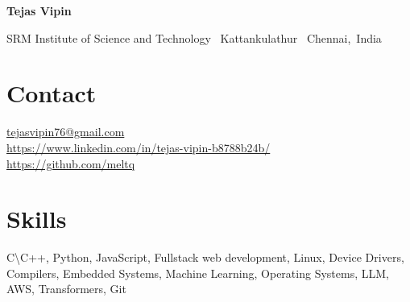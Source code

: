 \documentclass{OpenCV}
\newlength{\hvspace}
\begin{document}
\begin{center}
    \noindent\textbf{\LARGE Tejas Vipin} \\
\end{center}
\vspace{\hvspace}
\hrulefill
\vspace{\hvspace}
\begin{center}
    \noindent SRM Institute of Science and Technology \textbullet\ Kattankulathur \textbullet\ Chennai,\, India \\
\end{center}
\vspace{\hvspace}
\vspace{-4pt}
\hrulefill
\vspace{-12pt}

\section*{Contact}
\faEnvelopeO\enskip \href{mailto:tejasvipin76@gmail.com}{tejasvipin76@gmail.com} \\
\faLinkedin\enskip\href{https://www.linkedin.com/in/tejas-vipin-b8788b24b/}{https://www.linkedin.com/in/tejas-vipin-b8788b24b/} \\
\faGithub\enskip\href{https://github.com/meltq}{https://github.com/meltq} \\

\section*{Skills}
C{\textbackslash}C++, Python, JavaScript, Fullstack web development, Linux, Device Drivers, Compilers, Embedded Systems, Machine Learning, Operating Systems, LLM, AWS, Transformers, Git
% 









\end{document}
